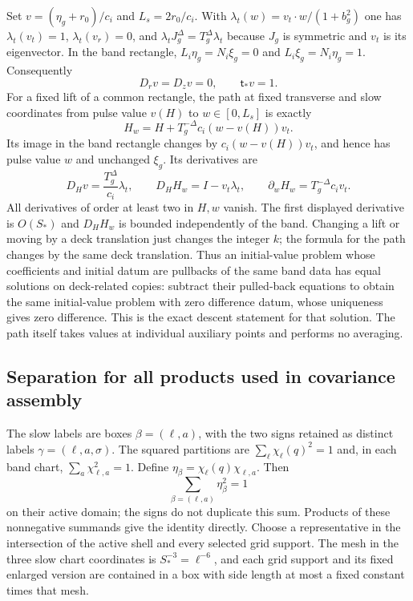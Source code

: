 \documentclass[10pt,a4paper]{article}
\begin{document}
Set $v=(\eta_g+r_0)/c_i$ and $L_s=2r_0/c_i$.  With
$\lambda_t(w)=v_t\cdot w/(1+b_g^2)$ one has
$\lambda_t(v_t)=1$, $\lambda_t(v_r)=0$, and
$\lambda_tJ_g^\Delta=T_g^\Delta\lambda_t$ because $J_g$ is symmetric
and $v_t$ is its eigenvector.  In the band rectangle,
$L_i\eta_g=N_i\xi_g=0$ and $L_i\xi_g=N_i\eta_g=1$.
Consequently
\[
 D_rv=D_zv=0,\qquad\mathsf t_*v=1.
\]
For a fixed lift of a common rectangle, the path at fixed transverse
and slow coordinates from pulse value $v(H)$ to $w\in[0,L_s]$ is
exactly
\[
 H_w=H+T_g^{-\Delta}c_i(w-v(H))v_t.
\]
Its image in the band rectangle changes by
$c_i(w-v(H))v_t$, and hence has pulse value $w$ and unchanged
$\xi_g$.  Its derivatives are
\[
 D_Hv=\frac{T_g^\Delta}{c_i}\lambda_t,
 \qquad D_HH_w=I-v_t\lambda_t,
 \qquad \partial_wH_w=T_g^{-\Delta}c_iv_t.
\]
All derivatives of order at least two in $H,w$ vanish.  The first
displayed derivative is $O(S_*)$ and $D_HH_w$ is bounded independently
of the band.  Changing a lift or moving by a deck translation just
changes the integer $k$; the formula for the path changes by the same
deck translation.  Thus an initial-value problem whose coefficients
and initial datum are pullbacks of the same band data has equal
solutions on deck-related copies: subtract their pulled-back equations
to obtain the same initial-value problem with zero difference datum,
whose uniqueness gives zero difference.  This is the exact descent
statement for that solution.  The path itself takes values at
individual auxiliary points and performs no averaging.

\subsection{Separation for all products used in covariance assembly}
The slow labels are boxes $\beta=(\ell,a)$, with the two signs retained
as distinct labels $\gamma=(\ell,a,\sigma)$.  The squared partitions
are $\sum_\ell\chi_\ell(q)^2=1$ and, in each band chart,
$\sum_a\chi_{\ell,a}^2=1$.  Define
$\eta_\beta=\chi_\ell(q)\chi_{\ell,a}$.  Then
\[
 \sum_{\beta=(\ell,a)}\eta_\beta^2=1
\]
on their active domain; the signs do not duplicate this sum.  Products
of these nonnegative summands give the identity directly.  Choose a
representative in the intersection of the active shell and every
selected grid support.  The mesh in the three slow chart coordinates
is $S_*^{-3}=\ell^{-6}$, and each grid support and its fixed enlarged
version are contained in a box with side length at most a fixed
constant times that mesh.
\end{document}
